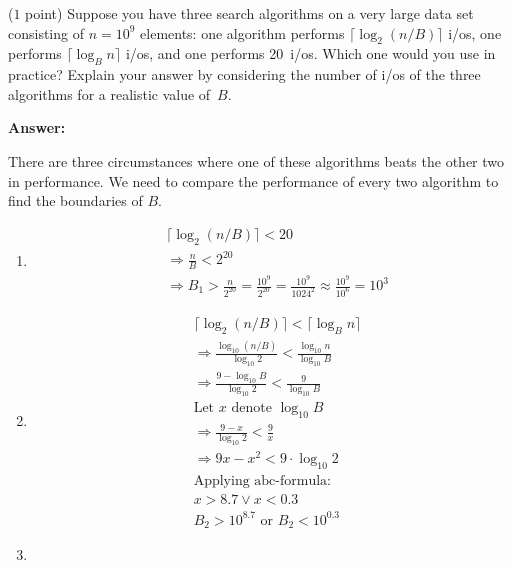 \documentclass{article}
\newcommand{\io}{{\sc i/o}\xspace}
\newcommand{\ios}{{\io}s\xspace}
\newcounter{rcounter}
\newenvironment{rlist}%
{\begin{list}{\setnr-\arabic{rcounter}}{\usecounter{rcounter}}}{\end{list}}
\begin{document}
\begin{rlist}

\item ($1$ point)
    Suppose you have three search algorithms on a very large data set consisting of $n=10^9$ elements: one algorithm performs $\lceil \log_2 (n/B)\rceil$ \ios, one performs $\lceil \log_B n \rceil$ \ios, and one performs 20~\ios. Which one would you use in practice? Explain your answer by considering the number of \ios of the three algorithms for a realistic value of~$B$.
    
    \textbf{Answer:}
    
    There are three circumstances where one of these algorithms beats the other two in performance. We need to compare the performance of every two algorithm to find the boundaries of $B$.
    \begin{enumerate}
        \item[(i)]
            \begin{align*}
                &\lceil \log_2 (n/B)\rceil < 20 \\
                &\Longrightarrow \frac{n}{B} < 2^{20} \\
                &\Longrightarrow B_1 > \frac{n}{2^{20}} = \frac{10^9}{2^{20}} = \frac{10^9}{1024^2} \approx \frac{10^9}{10^6} = 10^3
            \end{align*}
        \item[(ii)]
            \begin{align*}
                &\lceil \log_2 (n/B)\rceil < \lceil \log_B n \rceil\\
                &\Longrightarrow \frac{\log_{10}(n/B)}{\log_{10}2} < \frac{\log_{10}n}{\log_{10}B} \\
                &\Longrightarrow \frac{9-\log_{10}B}{\log_{10}2} < \frac{9}{\log_{10}B} \\
                &\textrm{Let $x$ denote } \log_{10}B\\
                &\Longrightarrow \frac{9-x}{\log_{10}2} < \frac{9}{x} \\
                &\Longrightarrow 9x-x^2 < 9 \cdot \log_{10}2\\
                &\textrm{Applying abc-formula:}\\
                & x > 8.7 \vee x < 0.3\\
                & B_2 > 10^{8.7} \textrm{  or  } B_2 < 10^{0.3}
            \end{align*}
        \item[(iii)]
            \begin{align*}

\end{align*}
\end{enumerate}
\end{rlist}
\end{document}
